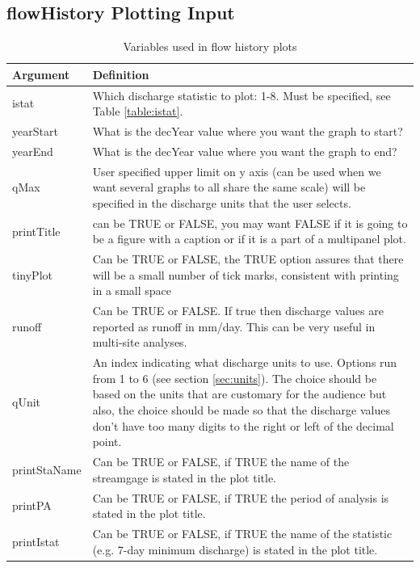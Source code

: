 \documentclass[a4paper,11pt]{article}\usepackage[]{graphicx}\usepackage[]{color}
\begin{document}
\subsection{flowHistory Plotting Input}
\label{sec:flowHistoryVariables}
\begin{table}[ht]
\caption{Variables used in flow history plots  \label{tab:flowHistoryVariables}}
\begin{tabularx}{\textwidth}{lX}
\hline
  \textbf{Argument} & \textbf{Definition} \\
\hline
istat & Which discharge statistic to plot: 1-8.  Must be specified, see Table \ref{table:istat}. \\
yearStart\footnotemark[1] & What is the decYear value where you want the graph to start? \\
yearEnd\footnotemark[1] & What is the decYear value where you want the graph to end? \\
qMax & User specified upper limit on y axis (can be used when we want several graphs to all share the same scale) will be specified in the discharge units that the user selects. \\
printTitle & can be TRUE or FALSE, you may want FALSE if it is going to be a figure with a caption or if it is a part of a multipanel plot. \\
tinyPlot & Can be TRUE or FALSE, the TRUE option assures that there will be a small number of tick marks, consistent with printing in a small space \\
runoff & Can be TRUE or FALSE.  If true then discharge values are reported as runoff in mm/day.  This can be very useful in multi-site analyses. \\
qUnit & An index indicating what discharge units to use.  Options run from 1 to 6 (see section \ref{sec:units}).  The choice should be based on the units that are customary for the audience but also, the choice should be made so that the discharge values don't have too many digits to the right or left of the decimal point.\\
printStaName\footnotemark[2] & Can be TRUE or FALSE, if TRUE the name of the streamgage is stated in the plot title. \\
printPA\footnotemark[2] & Can be TRUE or FALSE, if TRUE the period of analysis is stated in the plot title. \\
printIstat\footnotemark[2] & Can be TRUE or FALSE, if TRUE the name of the statistic (e.g. 7-day minimum discharge) is stated in the plot title. \\

\hline
\end{tabularx}

\end{table}
\end{document}

